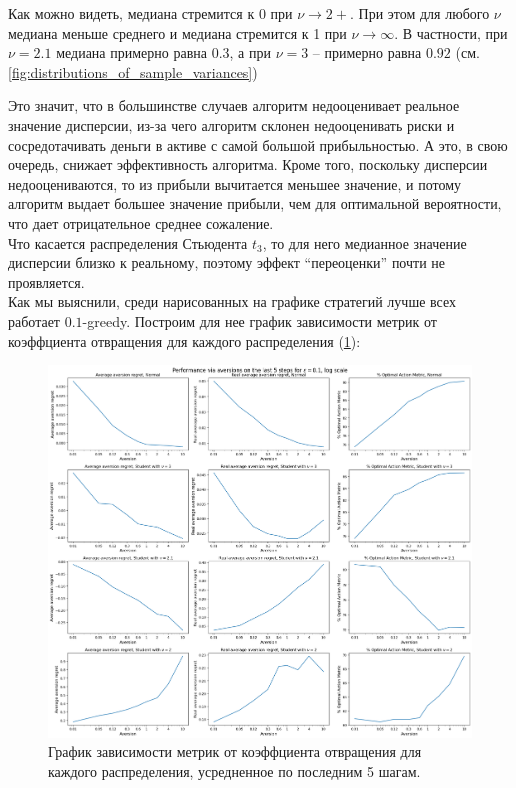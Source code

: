 \documentclass{article}
\begin{document}
Как можно видеть, медиана стремится к 0 при $\nu \to 2+$. При этом для любого $\nu$ медиана меньше среднего и медиана стремится к 1 при $\nu \to \infty$. В частности, при $\nu=2.1$ медиана примерно равна $0.3$, а при $\nu=3$ -- примерно равна $0.92$ (см. \ref{fig:distributions_of_sample_variances})

Это значит, что в большинстве случаев алгоритм недооценивает реальное значение дисперсии, из-за чего алгоритм склонен недооценивать риски и сосредотачивать деньги в активе с самой большой прибыльностью. А это, в свою очередь, снижает эффективность алгоритма. \label{negative_regret} Кроме того, поскольку дисперсии недооцениваются, то из прибыли вычитается меньшее значение, и потому алгоритм выдает большее значение прибыли, чем для оптимальной вероятности, что дает отрицательное среднее сожаление. \\

Что касается распределения Стьюдента $t_3$, то для него медианное значение дисперсии близко к реальному, поэтому эффект ``переоценки'' почти не проявляется. \\

Как мы выяснили, среди нарисованных на графике стратегий лучше всех работает $0.1$-greedy. Построим для нее график зависимости метрик от коэффциента отвращения для каждого распределения (\ref{fig:aversion_last_5_steps}):

\begin{figure}[h] %
\centering
\includegraphics[width=6in]{theory_tester/theory_images/epsilon_greedy/aversion_last_5_steps.png}
\caption{График зависимости метрик от коэффциента отвращения для каждого распределения, усредненное по последним 5 шагам.}
\label{fig:aversion_last_5_steps}
\end{figure}
\end{document}
